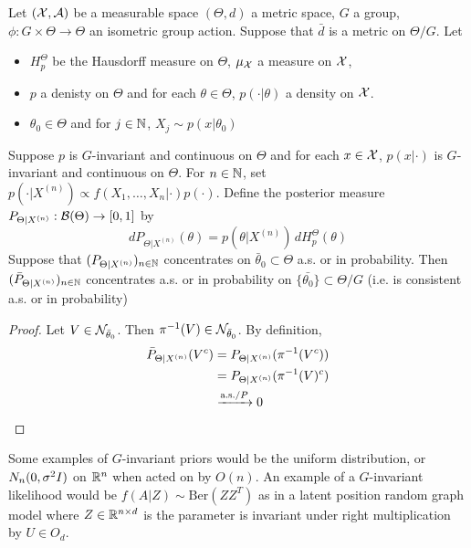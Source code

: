 \documentclass{book}
\begin{document}
	\begin{ex}
	Let $(\mathcal{X}, \mathcal{A})$ be a measurable space $(\Theta, d)$ a metric space, $G$ a group, $\phi: G \times \Theta \rightarrow \Theta$ an isometric group action. Suppose that $\bar{d}$ is a metric on $\Theta / G$. Let 
	\begin{itemize}
	\item $H_p^{\Theta}$ be the Hausdorff measure on $\Theta$, $\mu_{\mathcal{X}}$ a measure on $\mathcal{X}$, 
	\item $p$ a denisty on $\Theta$ and for each $\theta \in \Theta$, $p(\cdot|\theta)$ a density on $\mathcal{X}$. 
	\item $\theta_0 \in \Theta$ and for $j \in \mathbb{N}$, $X_j \sim p(x|\theta_0)$
	\end{itemize}
	Suppose $p$ is $G$-invariant and continuous on $\Theta$ and for each $x \in \mathcal{X}$, $p(x| \cdot)$ is $G$-invariant and continuous on $\Theta$. For $n \in \mathbb{N}$, set $p(\cdot|X^{(n)}) \propto f(X_1, \ldots, X_n| \cdot) p(\cdot)$. Define the posterior measure $P_{\Theta|X^{(n)}}: \mathcal{B}(\Theta) \rightarrow [0, 1]$ by 
	\begin{equation*}
	d P_{\Theta|X^{(n)}} (\theta) = p(\theta |X^{(n)}) \, dH_p^{\Theta} (\theta)
	\end{equation*}
	Suppose that $(P_{\Theta|X^{(n)}})_{n \in \mathbb{N}}$ concentrates on $\bar{\theta}_0 \subset \Theta$ a.s. or in probability. Then $(\bar{P}_{\Theta|X^{(n)}})_{n \in \mathbb{N}}$ concentrates a.s. or in probability on $\{\bar{\theta_0}\} \subset \Theta / G$ (i.e. is consistent a.s. or in probability)
	\end{ex}
	
	\begin{proof}
	Let $V \in \mathcal{N}_{\bar{\theta}_0}$. Then $\pi^{-1}(V) \in \mathcal{N}_{\bar{\theta}_0}$. By definition, 
	\begin{align*}
	\bar{P}_{\Theta|X^{(n)}}(V^c)
	&= P_{\Theta|X^{(n)}}(\pi^{-1}(V^c)) \\
	&= P_{\Theta|X^{(n)}}(\pi^{-1}(V)^c) \\
	&\xrightarrow{\text{a.s./$P$}} 0 
	\end{align*}
	\end{proof}
	
	\begin{note}
	Some examples of $G$-invariant priors would be the uniform distribution, or $N_n(0, \sigma^2I)$ on $\mathbb{R}^n$ when acted on by $O(n)$. An example of a $G$-invariant likelihood would be $f(A|Z) \sim \text{Ber}(ZZ^T)$ as in a latent position random graph model where $Z \in \mathbb{R}^{n \times d}$ is the parameter is invariant under right multiplication by $U \in O_d$.
	\end{note}
	
\end{document}
